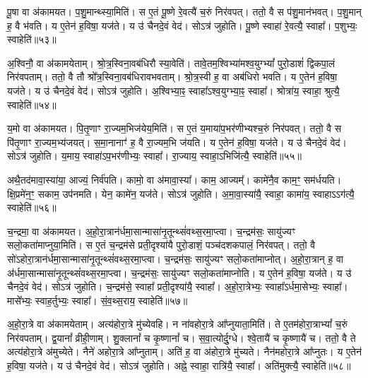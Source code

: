 पू॒षा वा अ॑कामयत।
प॒शु॒मान्थ्स्या॒मिति॑।
स ए॒तं पू॒ष्णे रे॒वत्यै॑ च॒रुं निर॑वपत्।
ततो॒ वै स प॑शु॒मान॑भवत्।
प॒शु॒मान् ह॒ वै भ॑वति।
य ए॒तेन॑ ह॒विषा॒ यज॑ते।
य उ॑ चैनदे॒वं वेद॑।
सोऽत्र॑ जुहोति।
पू॒ष्णे स्वाहा॑ रे॒वत्यै॒ स्वाहा᳚।
प॒शुभ्यः॒ स्वाहेति॑॥५३॥\ip

अ॒श्विनौ॒ वा अ॑कामयेताम्।
श्रो॒त्र॒स्विना॒वब॑धिरौ स्या॒वेति॑।
तावे॒तम॒श्विभ्या॑मश्व॒युग्भ्यां᳚ पुरो॒डाशं॑ द्विकपा॒लं निर॑वपताम्।
ततो॒ वै तौ श्रो᳚त्र॒स्विना॒वब॑धिरावभवताम्।
श्रो॒त्र॒स्वी ह॒ वा अब॑धिरो भवति।
य ए॒तेन॑ ह॒विषा॒ यज॑ते।
य उ॑ चैनदे॒वं वेद॑।
सोऽत्र॑ जुहोति।
अ॒श्विभ्या॒ꣴ॒ स्वाहा᳚\-ऽश्व॒युग्भ्या॒ꣴ॒ स्वाहा᳚।
श्रोत्रा॑य॒ स्वाहा॒ श्रुत्यै॒ स्वाहेति॑॥५४॥\ip

य॒मो वा अ॑कामयत।
पि॒तृ॒णाꣳ रा॒ज्यम॒भिज॑येय॒मिति॑।
स ए॒तं य॒माया॑प॒भर॑णीभ्यश्च॒रुं निर॑पवत्।
ततो॒ वै स पि॑तृ॒णाꣳ रा॒ज्य\-म॒भ्य॑जयत्।
स॒मा॒नानाꣳ॑ ह॒ वै रा॒ज्यम॒भि ज॑यति।
य ए॒तेन॑ ह॒विषा॒ यज॑ते।
य उ॑ चैनदे॒वं वेद॑।
सोऽत्र॑ जुहोति।
य॒माय॒ स्वाहा॑\-ऽप॒भर॑णीभ्यः॒ स्वाहा᳚।
रा॒ज्याय॒ स्वाहा॒ऽभिजि॑त्यै॒ स्वाहेति॑॥५५॥\ip

अथै॒तद॑मावा॒स्या॑या॒ आज्यं॒ निर्व॑पति।
कामो॒ वा अ॑मावा॒स्या᳚।
काम॒ आज्यम्᳚।
कामे॑नै॒व काम॒ꣳ॒ सम॑र्धयति।
क्षि॒प्रमे॑न॒ꣳ॒ सकाम॒ उप॑नमति।
येन॒ कामे॑न॒ यज॑ते।
सोऽत्र॑ जुहोति।
अ॒मा॒वा॒स्या॑यै॒ स्वाहा॒ कामा॑य॒ स्वाहा\-ऽऽग॑त्यै॒ स्वाहेति॑॥५६॥\ip\anuvakamend[मि॒त्र इन्द्रः॑ प्र॒जा\-प॑ति॒र्दश॑ द॒शाप॒ एका॑दश॒ विश्वे॒ ब्रह्म॒ दश॑दश॒ विष्णु॒स्त्रयो॑दश॒ वस॑व॒ इन्द्रो॒\-ऽजो\-ऽहि॒र्वै बु॒ध्नियः॑ पू॒षा\-ऽश्विनौ॑ य॒मो दश॑ द॒शाथै॒तद॑मावा॒स्या॑या अ॒ष्टौ पञ्च॑दश]

च॒न्द्रमा॒ वा अ॑कामयत।
अ॒हो॒रा॒त्रान॑र्धमा॒सान्मासा॑नृ॒तून्थ्सं॑\-वथ्स॒रमा॒प्त्वा।
च॒न्द्रम॑सः॒ सायु॑ज्यꣳ सलो॒कता॑माप्नुया॒मिति॑।
स ए॒तं च॒न्द्रम॑से प्रती॒दृश्या॑यै पुरो॒डाशं॒ पञ्च॑\-दश\-कपालं॒ निर॑वपत्।
ततो॒ वै सो॑\-ऽहोरा॒त्रान॑र्ध\-मा॒सान्मासा॑\-नृ॒तून्थ्सं॑वथ्स॒र\-मा॒प्त्वा।
च॒न्द्रम॑सः॒ सायु॑ज्यꣳ सलो॒कता॑माप्नोत्।
अ॒हो॒रा॒त्रान् ह॒ वा अ॑र्ध\-मा॒सान्मासा॑\-नृ॒तून्थ्सं॑वथ्स॒र\-मा॒प्त्वा।
च॒न्द्रम॑सः॒ सायु॑ज्यꣳ सलो॒कता॑\-माप्नोति।
य ए॒तेन॑ ह॒विषा॒ यज॑ते।
य उ॑ चैनदे॒वं वेद॑।
सोऽत्र॑ जुहोति।
च॒न्द्रम॑से॒ स्वाहा᳚ प्रती॒दृश्या॑यै॒ स्वाहा᳚।
अ॒हो॒रा॒त्रेभ्यः॒ स्वाहा᳚\-ऽर्धमा॒सेभ्यः॒ स्वाहा᳚।
मासे᳚भ्यः॒ स्वाह॒र्तुभ्यः॒ स्वाहा᳚।
सं॒व॒थ्स॒राय॒ स्वाहेति॑॥५७॥\ip

अ॒हो॒रा॒त्रे वा अ॑कामयेताम्।
अत्य॑होरा॒त्रे मु॑च्येवहि।
न ना॑वहोरा॒त्रे आ᳚प्नुयाता॒मिति॑।
ते ए॒तम॑होरा॒त्राभ्यां᳚ च॒रुं निर॑वपताम्।
द्व॒यानां᳚ व्रीही॒णाम्।
शु॒क्लानां᳚ च कृ॒ष्णानां᳚ च।
स॒वा॒त्योर्दु॒ग्धे।
श्वे॒तायै॑ च कृ॒ष्णायै॑ च।
ततो॒ वै ते अत्य॑होरा॒त्रे अ॑मुच्येते।
नैने॑ अहोरा॒त्रे आ᳚प्नुताम्।
अति॑ ह॒ वा अ॑होरा॒त्रे मु॑च्यते।
नैन॑महोरा॒त्रे आ᳚प्नुतः।
य ए॒तेन॑ ह॒विषा॒ यज॑ते।
य उ॑ चैनदे॒वं वेद॑।
सोऽत्र॑ जुहोति।
अह्ने॒ स्वाहा॒ रात्रि॑यै॒ स्वाहा᳚।
अति॑मुक्त्यै॒ स्वाहेति॑॥५८॥\ip

